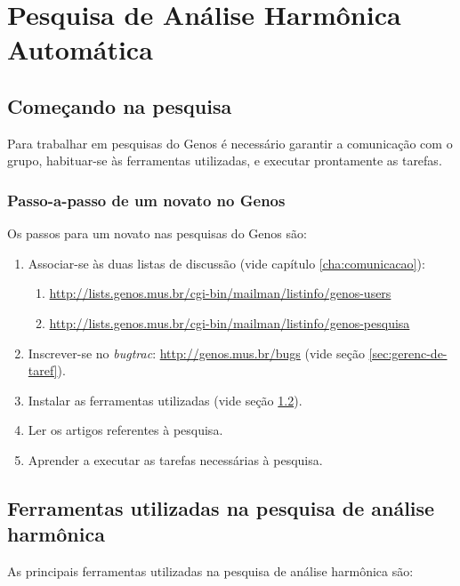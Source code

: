 \documentclass[12pt,brazil]{book}
\begin{document}
\chapter{Pesquisa de Análise Harmônica Automática}
\label{cha:anal-harm-autom}

\section{Começando na pesquisa}
\label{sec:comec-na-pesq}

Para trabalhar em pesquisas do Genos é necessário garantir a
comunicação com o grupo, habituar-se às ferramentas utilizadas, e
executar prontamente as tarefas.

\subsection{Passo-a-passo de um novato no Genos}
\label{sec:passo-passo-de}

Os passos para um novato nas pesquisas do Genos são:

\begin{enumerate}
\item Associar-se às duas listas de discussão (vide capítulo
  \ref{cha:comunicacao}):
  \begin{enumerate}
  \item \url{http://lists.genos.mus.br/cgi-bin/mailman/listinfo/genos-users}
  \item \url{http://lists.genos.mus.br/cgi-bin/mailman/listinfo/genos-pesquisa}
  \end{enumerate}
\item Inscrever-se no \textit{bugtrac}: \url{http://genos.mus.br/bugs}
  (vide seção \ref{sec:gerenc-de-taref}).
\item Instalar as ferramentas utilizadas (vide seção
  \ref{sec:ferr-util-na}).
\item Ler os artigos referentes à pesquisa.
\item Aprender a executar as tarefas necessárias à pesquisa.
\end{enumerate}

\section{Ferramentas utilizadas na pesquisa de análise harmônica}
\label{sec:ferr-util-na}

As principais ferramentas utilizadas na pesquisa de análise harmônica
são:
\end{document}
